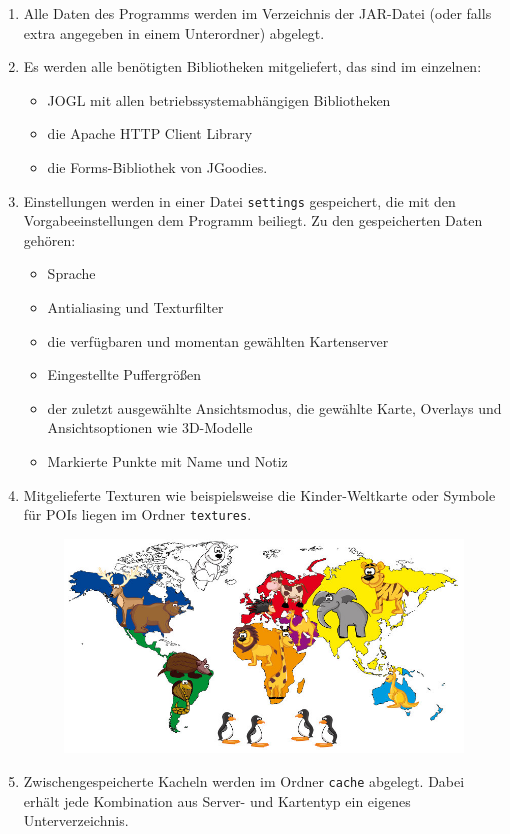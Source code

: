 \documentclass[10pt]{scrreprt}
\begin{document}
\begin{enumerate}[leftmargin=2cm]
\item Alle Daten des Programms werden im Verzeichnis der JAR-Datei (oder falls extra angegeben in einem Unterordner) abgelegt.
\item Es werden alle benötigten Bibliotheken mitgeliefert, das sind im einzelnen: 
\begin{itemize}
\item JOGL mit allen betriebssystemabhängigen Bibliotheken
\item die Apache HTTP Client Library
\item die Forms-Bibliothek von JGoodies.
\end{itemize}
\wunsch
\item Einstellungen werden in einer Datei \texttt{settings} gespeichert, die mit den Vorgabeeinstellungen dem Programm beiliegt. Zu den gespeicherten Daten gehören:
\begin{itemize}
\item Sprache
\item Antialiasing und Texturfilter
\item die verfügbaren und momentan gewählten Kartenserver
\item Eingestellte Puffergrößen
\item der zuletzt ausgewählte Ansichtsmodus, die gewählte Karte, Overlays und Ansichtsoptionen wie 3D-Modelle
\item Markierte Punkte mit Name und Notiz
\end{itemize}
\muss
\item Mitgelieferte Texturen wie beispielsweise die Kinder-Weltkarte oder Symbole für POIs liegen im Ordner \texttt{textures}.
\begin{figure}[!htb]
	\centering
	\includegraphics[scale=0.3]{Kinder-Weltkarte.jpg}
\end{figure}
\item Zwischengespeicherte Kacheln werden im Ordner \texttt{cache} abgelegt. Dabei erhält jede Kombination aus Server- und Kartentyp ein eigenes Unterverzeichnis.
\end{enumerate}
\end{document}
